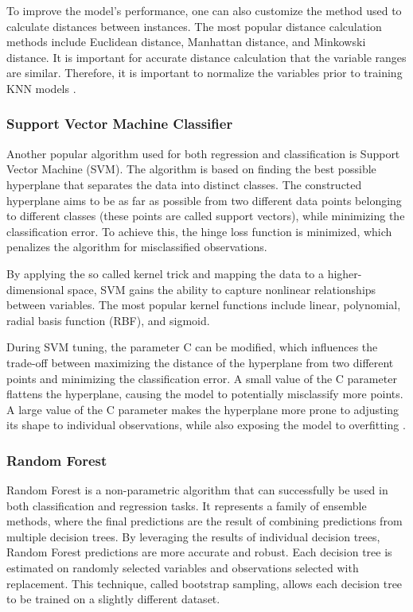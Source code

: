 To improve the model's performance, one can also customize the method used to calculate distances between instances. The most popular distance calculation methods include Euclidean distance, Manhattan distance, and Minkowski distance. It is important for accurate distance calculation that the variable ranges are similar. Therefore, it is important to normalize the variables prior to training KNN models \autocite{Fix1989}.

\subsubsection{Support Vector Machine Classifier}
Another popular algorithm used for both regression and classification is Support Vector Machine (SVM). The algorithm is based on finding the best possible hyperplane that separates the data into distinct classes. The constructed hyperplane aims to be as far as possible from two different data points belonging to different classes (these points are called support vectors), while minimizing the classification error. To achieve this, the hinge loss function is minimized, which penalizes the algorithm for misclassified observations.

By applying the so called kernel trick and mapping the data to a higher-dimensional space, SVM gains the ability to capture nonlinear relationships between variables. The most popular kernel functions include linear, polynomial, radial basis function (RBF), and sigmoid.

During SVM tuning, the parameter C can be modified, which influences the trade-off between maximizing the distance of the hyperplane from two different points and minimizing the classification error. A small value of the C parameter flattens the hyperplane, causing the model to potentially misclassify more points. A large value of the C parameter makes the hyperplane more prone to adjusting its shape to individual observations, while also exposing the model to overfitting \autocite{Vapnik2000}.

\subsubsection{Random Forest}
Random Forest is a non-parametric algorithm that can successfully be used in both classification and regression tasks. It represents a family of ensemble methods, where the final predictions are the result of combining predictions from multiple decision trees. By leveraging the results of individual decision trees, Random Forest predictions are more accurate and robust. Each decision tree is estimated on randomly selected variables and observations selected with replacement. This technique, called bootstrap sampling, allows each decision tree to be trained on a slightly different dataset.

